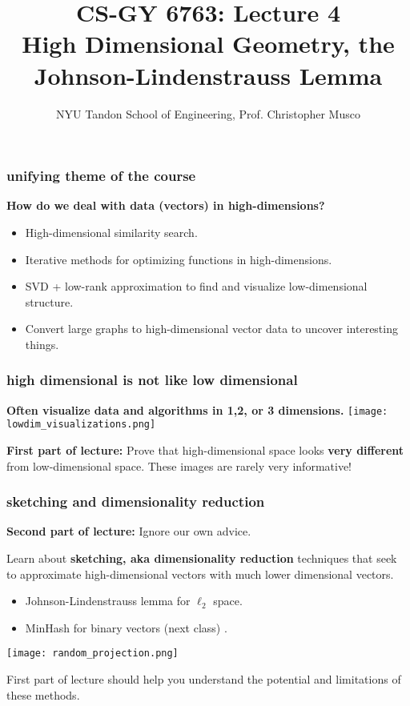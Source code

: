 \documentclass[compress]{beamer}
\title{CS-GY 6763: Lecture 4 \\  High Dimensional Geometry, the Johnson-Lindenstrauss Lemma}
\author{NYU Tandon School of Engineering, Prof. Christopher Musco}
\date{}
\begin{document}
\begin{frame}
	\titlepage 
\end{frame}


\begin{frame}
	\frametitle{unifying theme of the course}
	\begin{center}
		\textbf{How do we deal with data (vectors) in high-dimensions?}
	\end{center}
\begin{itemize}
	\item High-dimensional similarity search.  
	\item Iterative methods for optimizing functions in high-dimensions.
	\item SVD + low-rank approximation to find and visualize low-dimensional structure.
	\item Convert large graphs to high-dimensional vector data to uncover interesting things. 
\end{itemize}
\end{frame}

\begin{frame}
	\frametitle{high dimensional is not like low dimensional}
	\begin{center}
		\textbf{Often visualize data and algorithms in 1,2, or 3 dimensions.}
		\texttt{[image: lowdim\_visualizations.png]}
		
		\textbf{First part of lecture:} Prove that high-dimensional space looks \textbf{\alert{very different}} from low-dimensional space. These images are rarely very informative! 
	\end{center}
\end{frame}

\begin{frame}
	\frametitle{sketching and dimensionality reduction}
	\begin{center}
		\textbf{Second part of lecture:} Ignore our own advice. 
	\end{center}
		Learn about \alert{\textbf{sketching, aka dimensionality reduction}} techniques that seek to approximate high-dimensional vectors with much lower dimensional vectors. 
		\begin{itemize}
			\item Johnson-Lindenstrauss lemma for $\ell_2$ space.
			\item MinHash for binary vectors (next class) . 
		\end{itemize}
		\begin{center}
			\vspace{-.75em}
		\texttt{[image: random\_projection.png]}
		\vspace{-.75em}
		\end{center}
		
		First part of lecture should help you understand the potential and limitations of these methods. 
\end{frame}
\end{document}
